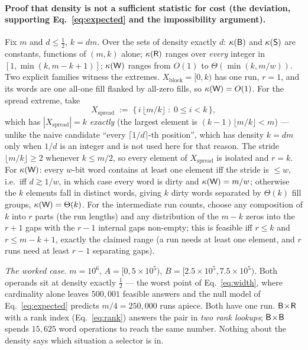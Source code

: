 \paragraph*{Proof that density is not a sufficient statistic for cost (the deviation, supporting
Eq.~\eqref{eq:expected} and the impossibility argument).}
Fix $m$ and $d\le\tfrac12$, $k=dm$. Over the sets of density exactly $d$: $\kappa(\textsf{B})$ and
$\kappa(\textsf{S})$ are constants, functions of $(m,k)$ alone; $\kappa(\textsf{R})$ ranges over \emph{every}
integer in $[1,\min(k,m-k+1)]$; $\kappa(\textsf{W})$ ranges from $O(1)$ to $\Theta(\min(k,m/w))$. Two explicit
families witness the extremes. $X_{\mathrm{block}}=[0,k)$ has one run, $r=1$, and its words are one
all-one fill flanked by all-zero fills, so $\kappa(\textsf{W})=O(1)$. For the spread extreme, take
\begin{equation}
X_{\mathrm{spread}} \;:=\; \{\,i\,\lfloor m/k\rfloor \;:\; 0\le i<k\,\},
\label{eq:s3-xspread}
\end{equation}
which has $|X_{\mathrm{spread}}|=k$ \emph{exactly} (the largest element is $(k-1)\lfloor m/k\rfloor<m$)
--- unlike the naive candidate ``every $\lceil1/d\rceil$-th position'', which has density $k=dm$ only
when $1/d$ is an integer and is not used here for that reason. The stride $\lfloor m/k\rfloor\ge2$
whenever $k\le m/2$, so every element of $X_{\mathrm{spread}}$ is isolated and $r=k$. For $\kappa(\textsf{W})$:
every $w$-bit word contains at least one element iff the stride is $\le w$, i.e.\ iff $d\gtrsim1/w$, in
which case every word is dirty and $\kappa(\textsf{W})=m/w$; otherwise the $k$ elements fall in distinct
words, giving $k$ dirty words separated by $\Theta(k)$ fill groups, $\kappa(\textsf{W})=\Theta(k)$. For the
intermediate run counts, choose any composition of $k$ into $r$ parts (the run lengths) and any
distribution of the $m-k$ zeros into the $r+1$ gaps with the $r-1$ internal gaps non-empty; this is
feasible iff $r\le k$ and $r\le m-k+1$, exactly the claimed range (a run needs at least one element,
and $r$ runs need at least $r-1$ separating gaps).

\emph{The worked case.} $m=10^6$, $A=[0,5\times10^5)$, $B=[2.5\times10^5,7.5\times10^5)$. Both operands
sit at density exactly $\tfrac12$ --- the worst point of Eq.~\eqref{eq:width}, where cardinality alone
leaves $500{,}001$ feasible answers and the null model of Eq.~\eqref{eq:expected} predicts $m/4=250{,}000$
runs apiece. Both have one run. $\textsf{B}\!\times\!\textsf{R}$ with a rank index (Eq.~\eqref{eq:rank})
answers the pair in \emph{two rank lookups}; $\textsf{B}\!\times\!\textsf{B}$ spends $15{,}625$ word operations to
reach the same number. Nothing about the density says which situation a selector is in.

